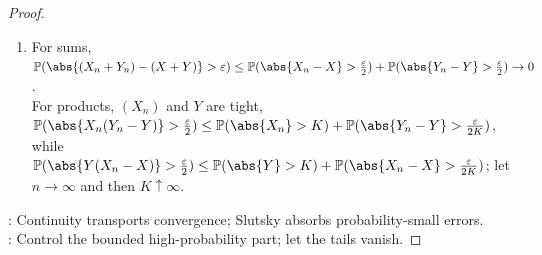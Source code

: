 \begin{theorem}
\begin{proof}
\begin{enumerate}[label=(\roman*)]
Also $X_n\rightsquigarrow X$ implies $(X_n)$ is tight, so $\mathbb{P}(\abs{X_n(Y_n-c)}>\varepsilon)\leq\mathbb{P}(\abs{X_n}>K)+\mathbb{P}(\abs{Y_n-c}>\frac{\varepsilon}{K})$.\\
Letting $n\to\infty$, then $K\uparrow\infty$ gives $X_n(Y_n-c)\xrightarrow{\mathbb{P}}0$.\\
Since $cX_n\rightsquigarrow cX$ by (ii), the additive perturbation just proved gives $X_nY_n=cX_n+X_n(Y_n-c)\rightsquigarrow cX$.
\item For sums, $\mathbb{P}(\abs{(X_n+Y_n)-(X+Y)}>\varepsilon)\leq\mathbb{P}(\abs{X_n-X}>\frac{\varepsilon}{2})+\mathbb{P}(\abs{Y_n-Y}>\frac{\varepsilon}{2})\to0$.\\
For products, $(X_n)$ and $Y$ are tight, $\mathbb{P}(\abs{X_n(Y_n-Y)}>\frac{\varepsilon}{2})\leq\mathbb{P}(\abs{X_n}>K)+\mathbb{P}(\abs{Y_n-Y}>\frac{\varepsilon}{2K})$,\\
while $\mathbb{P}(\abs{Y(X_n-X)}>\frac{\varepsilon}{2})\leq\mathbb{P}(\abs{Y}>K)+\mathbb{P}(\abs{X_n-X}>\frac{\varepsilon}{2K})$; let $n\to\infty$ and then $K\uparrow\infty$.
\end{enumerate}
: Continuity transports convergence; Slutsky absorbs probability-small errors.\\
: Control the bounded high-probability part; let the tails vanish.
\end{proof}
\end{theorem}
